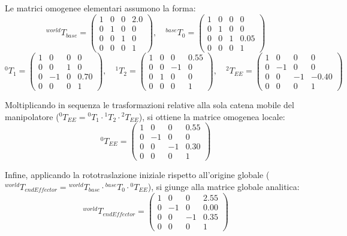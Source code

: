 \documentclass[11pt, a4paper]{report}
\begin{document}
Le matrici omogenee elementari assumono la forma:
\[
    ^{world}T_{base} = \begin{pmatrix} 1 & 0 & 0 & 2.0 \\ 0 & 1 & 0 & 0 \\ 0 & 0 & 1 & 0 \\ 0 & 0 & 0 & 1 \end{pmatrix}, \quad
    ^{base}T_{0} = \begin{pmatrix} 1 & 0 & 0 & 0 \\ 0 & 1 & 0 & 0 \\ 0 & 0 & 1 & 0.05 \\ 0 & 0 & 0 & 1 \end{pmatrix}
\]
\[
    ^{0}T_{1} = \begin{pmatrix} 1 & 0 & 0 & 0 \\ 0 & 0 & 1 & 0 \\ 0 & -1 & 0 & 0.70 \\ 0 & 0 & 0 & 1 \end{pmatrix}, \quad
    ^{1}T_{2} = \begin{pmatrix} 1 & 0 & 0 & 0.55 \\ 0 & 0 & -1 & 0 \\ 0 & 1 & 0 & 0 \\ 0 & 0 & 0 & 1 \end{pmatrix}, \quad
    ^{2}T_{EE} = \begin{pmatrix} 1 & 0 & 0 & 0 \\ 0 & -1 & 0 & 0 \\ 0 & 0 & -1 & -0.40 \\ 0 & 0 & 0 & 1 \end{pmatrix}
\]

Moltiplicando in sequenza le trasformazioni relative alla sola catena mobile del manipolatore (\(^{0}T_{EE} = {^{0}T_1} \cdot {^{1}T_2} \cdot {^{2}T_{EE}}\)), si ottiene la matrice omogenea locale:
\[
    ^{0}T_{EE} = \begin{pmatrix} 1 & 0 & 0 & 0.55 \\ 0 & -1 & 0 & 0 \\ 0 & 0 & -1 & 0.30 \\ 0 & 0 & 0 & 1 \end{pmatrix}
\]

Infine, applicando la rototraslazione iniziale rispetto all'origine globale (\(^{world}T_{endEffector} = {^{world}T_{base}} \cdot {^{base}T_0} \cdot {^{0}T_{EE}}\)), si giunge alla matrice globale analitica:
\[
    ^{world}T_{endEffector} =
    \begin{pmatrix}
        1 & 0 & 0 & 2.55 \\
        0 & -1 & 0 & 0.00 \\
        0 & 0 & -1 & 0.35 \\
        0 & 0 & 0 & 1
    \end{pmatrix}
\]
\end{document}
